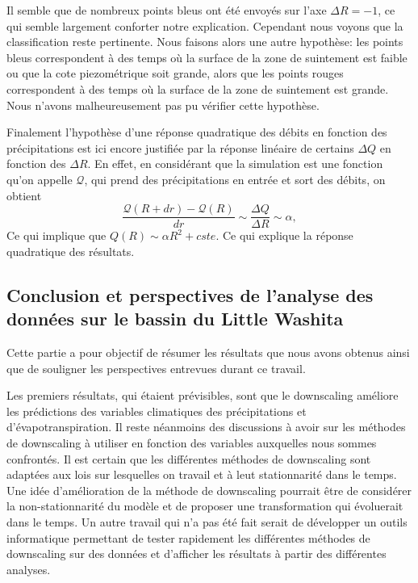 \documentclass[a4paper,11pt]{article}
\numberwithin{equation}{section}
\begin{document}
Il semble que de nombreux points bleus ont été  envoyés sur l'axe $\Delta R=-1$, ce qui semble largement conforter notre explication. Cependant nous voyons que la classification reste pertinente. Nous faisons alors une autre hypothèse: les points bleus correspondent à des temps où la surface de la zone de suintement est faible ou que la cote piezométrique soit grande, alors que les points rouges correspondent à des temps où la surface de la zone de suintement est grande. Nous n'avons malheureusement pas pu vérifier cette hypothèse.

Finalement l'hypothèse d'une réponse quadratique des débits en fonction des précipitations est ici encore justifiée par la réponse linéaire de certains $\Delta Q$ en fonction des $\Delta R$.
En effet, en considérant que la simulation est une fonction qu'on appelle $\mathcal{Q}$, qui prend des précipitations en entrée et sort des débits, on obtient \[\frac{\mathcal{Q}(R+dr)-\mathcal{Q}(R)}{dr}\sim \frac{\Delta Q}{\Delta R}\sim \alpha,\]
Ce qui implique que $Q(R)\sim \alpha R^2 + cste$.
Ce qui explique la réponse quadratique des résultats.


\subsection{Conclusion et perspectives de l'analyse des données sur le bassin du Little Washita} 

Cette partie a pour objectif de résumer les résultats que nous avons obtenus ainsi que de souligner les perspectives entrevues durant ce travail.

\vspace{0.7cm}

Les premiers résultats, qui étaient prévisibles, sont que le downscaling améliore les prédictions des variables climatiques des précipitations et d'évapotranspiration. Il reste néanmoins des discussions à avoir sur les méthodes de downscaling à utiliser en fonction des variables auxquelles nous sommes confrontés. Il est certain que les différentes méthodes de downscaling sont adaptées aux lois sur lesquelles on travail et à leut stationnarité dans le temps. Une idée d'amélioration de la méthode de downscaling pourrait être de considérer la non-stationnarité du modèle et de proposer une transformation qui évoluerait dans le temps. Un autre travail qui n'a pas été fait serait de développer un outils informatique permettant de tester rapidement les différentes méthodes de downscaling sur des données et d'afficher les résultats à partir des différentes analyses.
\end{document}
